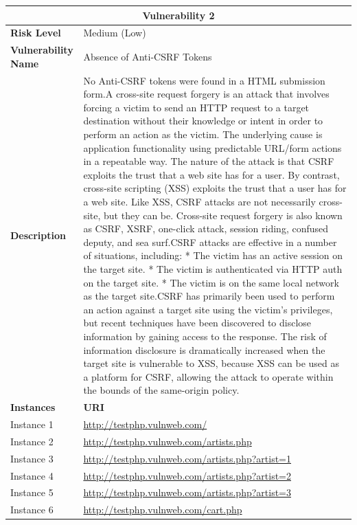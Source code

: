 \documentclass[12pt]{article}
\begin{document}
\begin{center}
\renewcommand{\arraystretch}{1.3}
\begin{longtable}{|l|p{10cm}|}
\hline
\multicolumn{2}{|c|}{\textbf{Vulnerability 2}} \\
\hline
\textbf{Risk Level} & Medium (Low) \\
\hline
\textbf{Vulnerability Name} & Absence of Anti-CSRF Tokens \\
\hline
\textbf{Description} & No Anti-CSRF tokens were found in a HTML submission form.A cross-site request forgery is an attack that involves forcing a victim to send an HTTP request to a target destination without their knowledge or intent in order to perform an action as the victim. The underlying cause is application functionality using predictable URL/form actions in a repeatable way. The nature of the attack is that CSRF exploits the trust that a web site has for a user. By contrast, cross-site scripting (XSS) exploits the trust that a user has for a web site. Like XSS, CSRF attacks are not necessarily cross-site, but they can be. Cross-site request forgery is also known as CSRF, XSRF, one-click attack, session riding, confused deputy, and sea surf.CSRF attacks are effective in a number of situations, including:    * The victim has an active session on the target site.    * The victim is authenticated via HTTP auth on the target site.    * The victim is on the same local network as the target site.CSRF has primarily been used to perform an action against a target site using the victim's privileges, but recent techniques have been discovered to disclose information by gaining access to the response. The risk of information disclosure is dramatically increased when the target site is vulnerable to XSS, because XSS can be used as a platform for CSRF, allowing the attack to operate within the bounds of the same-origin policy. \\
\hline
\textbf{Instances} & \textbf{URI} \\
\hline
Instance 1 & \url{http://testphp.vulnweb.com/} \\
\hline
Instance 2 & \url{http://testphp.vulnweb.com/artists.php} \\
\hline
Instance 3 & \url{http://testphp.vulnweb.com/artists.php?artist=1} \\
\hline
Instance 4 & \url{http://testphp.vulnweb.com/artists.php?artist=2} \\
\hline
Instance 5 & \url{http://testphp.vulnweb.com/artists.php?artist=3} \\
\hline
Instance 6 & \url{http://testphp.vulnweb.com/cart.php} \\

\end{longtable}
\end{center}
\end{document}
